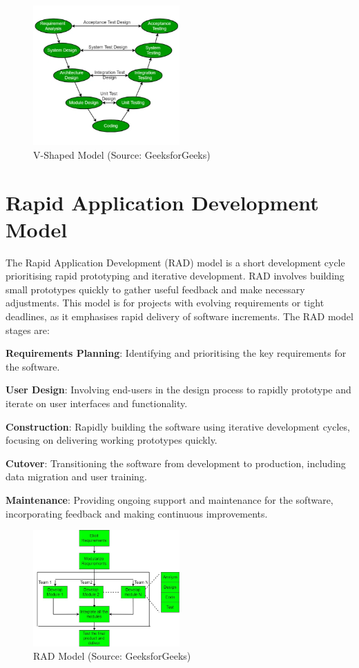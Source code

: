 \documentclass[12pt, a4paper]{article}
\begin{document}
\begin{figure}[h]
    \centering
    \includegraphics[width=0.5\textwidth]{images/v-model.png}
    \caption{V-Shaped Model (Source: GeeksforGeeks)}
    \label{fig:v-model}
\end{figure}

\section{Rapid Application Development Model}
The Rapid Application Development (RAD) model is a short development cycle prioritising rapid prototyping and iterative development. RAD involves building small prototypes quickly to gather useful feedback and make necessary adjustments. This model is for projects with evolving requirements or tight deadlines, as it emphasises rapid delivery of software increments.
The RAD model stages are:

\textbf{Requirements Planning}: Identifying and prioritising the key requirements for the software.

\textbf{User Design}: Involving end-users in the design process to rapidly prototype and iterate on user interfaces and functionality.

\textbf{Construction}: Rapidly building the software using iterative development cycles, focusing on delivering working prototypes quickly.

\textbf{Cutover}: Transitioning the software from development to production, including data migration and user training.

\textbf{Maintenance}: Providing ongoing support and maintenance for the software, incorporating feedback and making continuous improvements.


\begin{figure}[h]
    \centering
    \includegraphics[width=0.5\textwidth]{images/RAD-model.jpg}
    \caption{RAD Model (Source: GeeksforGeeks)}
    \label{fig:RAD}
\end{figure}
\end{document}
